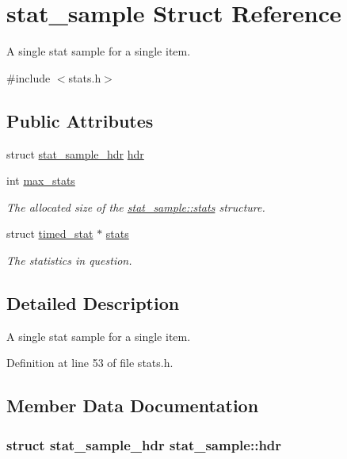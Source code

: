\hypertarget{structstat__sample}{\section{stat\-\_\-sample Struct Reference}
\label{structstat__sample}
}


A single stat sample for a single item.  




{\ttfamily \#include $<$stats.\-h$>$}

\subsection*{Public Attributes}
\begin{DoxyCompactItemize}
\item 
struct \hyperlink{structstat__sample__hdr}{stat\-\_\-sample\-\_\-hdr} \hyperlink{structstat__sample_acaef0f7b806544e00dfe8095bbf98842}{hdr}
\item 
int \hyperlink{structstat__sample_a9915339fedc4af2eee8ded2869cdb351}{max\-\_\-stats}
\begin{DoxyCompactList}\small\item\em The allocated size of the \hyperlink{structstat__sample_aa1e64901d0a1f17a163714488baa99fb}{stat\-\_\-sample\-::stats} structure. \end{DoxyCompactList}\item 
struct \hyperlink{structtimed__stat}{timed\-\_\-stat} $\ast$ \hyperlink{structstat__sample_aa1e64901d0a1f17a163714488baa99fb}{stats}
\begin{DoxyCompactList}\small\item\em The statistics in question. \end{DoxyCompactList}\end{DoxyCompactItemize}


\subsection{Detailed Description}
A single stat sample for a single item. 

Definition at line 53 of file stats.\-h.



\subsection{Member Data Documentation}
\hypertarget{structstat__sample_acaef0f7b806544e00dfe8095bbf98842}{
\subsubsection[{hdr}]{\setlength{\rightskip}{0pt plus 5cm}struct {\bf stat\-\_\-sample\-\_\-hdr} stat\-\_\-sample\-::hdr}}\label{structstat__sample_acaef0f7b806544e00dfe8095bbf98842}


